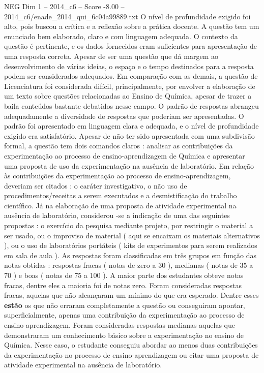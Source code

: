 \begin{textsample}{NEG Dim 1 – 2014\_c6 – Score -8.00 – 2014\_c6/enade\_2014\_qui\_6c04a99889.txt}
O nível de profundidade exigido foi alto, pois buscou a crítica e a reflexão sobre a prática docente.
A questão tem um enunciado bem elaborado, claro e com linguagem adequada.
O contexto da questão é pertinente, e os dados fornecidos eram suficientes para apresentação de uma resposta correta.
Apesar de ser uma questão que dá margem ao desenvolvimento de várias ideias, o espaço e o tempo destinados para a resposta podem ser considerados adequados.
Em comparação com as demais, a questão de Licenciatura foi considerada difícil, principalmente, por envolver a elaboração de um texto sobre questões relacionadas ao Ensino de Química, apesar de trazer a baila conteúdos bastante debatidos nesse campo.
O padrão de respostas abrangeu adequadamente a diversidade de respostas que poderiam ser apresentadas.
O padrão foi apresentado em linguagem clara e adequada, e o nível de profundidade exigido era satisfatório.
Apesar de não ter sido apresentada com uma subdivisão formal, a questão tem dois comandos claros : analisar as contribuições da experimentação ao processo de ensino-aprendizagem de Química e apresentar uma proposta de uso da experimentação na ausência de laboratório.
Em relação às contribuições da experimentação ao processo de ensino-aprendizagem, deveriam ser citados : o caráter investigativo, o não uso de procedimentos/receitas a serem executados e a desmistificação do trabalho científico.
Já na elaboração de uma proposta de atividade experimental na ausência de laboratório, considerou -se a indicação de uma das seguintes propostas : o exercício da pesquisa mediante projeto, por restringir o material a ser usado, ou o improviso de material ( aqui se encaixam os materiais alternativos ), ou o uso de laboratórios portáteis ( kits de experimentos para serem realizados em sala de aula ).
As respostas foram classificadas em três grupos em função das notas obtidas : respostas fracas ( notas de zero a 30 ), medianas ( notas de 35 a 70 ) e boas ( notas de 75 a 100 ).
A maior parte dos estudantes obteve notas fracas, dentre eles a maioria foi de notas zero.
Foram consideradas respostas fracas, aquelas que não alcançaram um mínimo do que era esperado.
Dentre esses \textbf{estão} os que não erraram completamente a questão ou conseguiram apontar, superficialmente, apenas uma contribuição da experimentação ao processo de ensino-aprendizagem.
Foram consideradas respostas medianas aquelas que demonstraram um conhecimento básico sobre a experimentação no ensino de Química.
Nesse caso, o estudante conseguiu abordar ao menos duas contribuições da experimentação no processo de ensino-aprendizagem ou citar uma proposta de atividade experimental na ausência de laboratório.

\end{textsample}
